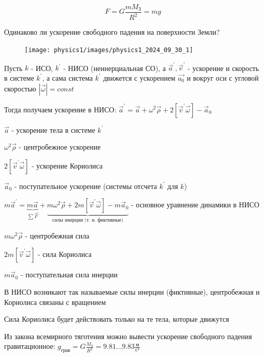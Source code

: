 \documentclass[12pt]{article}
\begin{document}
    \[F = G\frac{mM_{\text{З}}}{R^2} = mg\]

    Одинаково ли ускорение свободного падения на поверхности Земли? %

    \smallvspace

    \begin{minipage}{\textwidth}
        \begin{figure}
            \texttt{[image: physics1/images/physics1\_2024\_09\_30\_1]}
        \end{figure}

        Пусть $k$ - ИСО, $k^\prime$ - НИСО (неинерциальная СО), а $\vec{a}^\prime, \vec{v}^\prime$ - ускорение и скорость в системе $k^\prime$,
        а сама система $k^\prime$ движется с ускорением $\vec{a_0}$ и вокруг оси с угловой скоростью $|\vec{\omega}| = const$


        Тогда получаем ускорение в НИСО: $\vec{a}^\prime = \vec{a} + \omega^2 \vec{\rho} + 2 [\vec{v}^\prime \vec{\omega}] - \vec{a}_0$

        $\vec{a}$ - ускорение тела в системе $k^\prime$

        $\omega^2 \vec{\rho}$ - центробежное ускорение

    \end{minipage}

    \smallvspace

    $2 [\vec{v}^\prime \vec{\omega}]$ - ускорение Кориолиса

    $\vec{a}_0$ - поступательное ускорение (системы отсчета $k^\prime$ для $k$)

    $m\vec{a}^\prime = \underset{\sum \vec{F}}{\underbrace{m\vec{a}}} + \underset{\text{силы инерции (т. н. фиктивные)}}{\underbrace{m\omega^2 \vec{\rho} + 2m [\vec{v}^\prime \vec{\omega}] - m\vec{a}_0}}$ - основное уравнение динамики в НИСО

    $m \omega^2 \vec{\rho}$ - центробежная сила

    $2m [\vec{v}^\prime \vec{\omega}]$ - сила Кориолиса

    $m\vec{a}_0$ - поступательная сила инерции


    В НИСО возникают так называемые силы инерции (фиктивные), центробежная и Кориолиса связаны с вращением

    Сила Кориолиса будет действовать только на те тела, которые движутся

    Из закона всемирного тяготения можно вывести ускорение свободного падения гравитационное: $g_{\text{грав}} = G \frac{M_\text{З}}{R^2} = 9.81\dots9.83 \frac{\text{м}}{\text{с}^2}$
\end{document}
